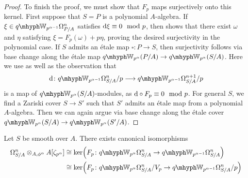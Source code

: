 \documentclass[DIV=12,numbers=enddot,leqno,bibliography=totoc]{scrartcl}
\begin{document}
\begin{proof}
		To finish the proof, we must show that $F_p$ maps surjectively onto this kernel. First suppose that $S=P$ is a polynomial $A$-algebra. If $\xi\in \qIW_{p^{\alpha-1}}\Omega_{P/A}^n$ satisfies $\mathop{}\!\mathrm{d}\xi\equiv 0\mod p$, then \cite[({[$d_\alpha$]})]{qWitt} shows that there exist $\omega$ and $\eta$ satisfying $\xi=F_p(\omega)+p\eta$, proving the desired surjectivity in the polynomial case. If $S$ admits an étale map $\square\colon P\rightarrow S$,  then surjectivity follows via base change along the étale map $\qIW_{p^\alpha}(P/A)\rightarrow \qIW_{p^\alpha}(S/A)$. Here we use \cite[Propositions~ and~]{qWitt} as well as the observation that
		\begin{equation*}
			\d\colon \qIW_{p^{\alpha-1}}\Omega_{S/A}^n/p\longrightarrow \qIW_{p^{\alpha-1}}\Omega_{S/A}^{n+1}/p
		\end{equation*}
		is a map of $\qIW_{p^\alpha}(S/A)$-modules, as $\mathop{}\!\mathrm{d}\circ F_p\equiv 0\mod p$. For general $S$, we find a Zariski cover $S\rightarrow S'$ such that $S'$ admits an étale map from a polynomial $A$-algebra. Then we can again argue via base change along the étale cover $\qIW_{p^\alpha}(S/A)\rightarrow \qIW_{p^\alpha}(S'/A)$. 
	\end{proof}
	\begin{lem}\label{lem:NygaardFrobeniusKernel}
		Let $S$ be smooth over $A$. There exists canonical isomorphisms
		\begin{align*}
			\Omega_{S/A}^n\otimes_{A,\phi^\alpha}A[\zeta_{p^\alpha}]&\cong\ker\left(F_p\colon \qIW_{p^{\alpha}}\Omega_{S/A}^n\rightarrow \qIW_{p^{\alpha-1}}\Omega_{S/A}^n\right)\\
			&\cong\ker\left(F_p\colon \qIW_{p^{\alpha}}\Omega_{S/A}^n/V_p\rightarrow \qIW_{p^{\alpha-1}}\Omega_{S/A}^n/p\right)
		\end{align*}
	\end{lem}
\end{document}
